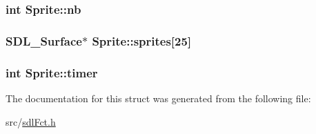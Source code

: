 \subsubsection[{nb}]{\setlength{\rightskip}{0pt plus 5cm}int Sprite\+::nb}\label{struct_sprite_af161aa99ddad84227993c7e115c42f8a}
\hypertarget{struct_sprite_ad8469d5efb3c49f4503cdd2e1e0cf84e}{}
\subsubsection[{sprites}]{\setlength{\rightskip}{0pt plus 5cm}S\+D\+L\+\_\+\+Surface$\ast$ Sprite\+::sprites\mbox{[}25\mbox{]}}\label{struct_sprite_ad8469d5efb3c49f4503cdd2e1e0cf84e}
\hypertarget{struct_sprite_a34eca7b18a9dcbad3a2e9c3bfa40f3c8}{}
\subsubsection[{timer}]{\setlength{\rightskip}{0pt plus 5cm}int Sprite\+::timer}\label{struct_sprite_a34eca7b18a9dcbad3a2e9c3bfa40f3c8}


The documentation for this struct was generated from the following file\+:\begin{DoxyCompactItemize}
\item 
src/\hyperlink{sdl_fct_8h}{sdl\+Fct.\+h}\end{DoxyCompactItemize}

